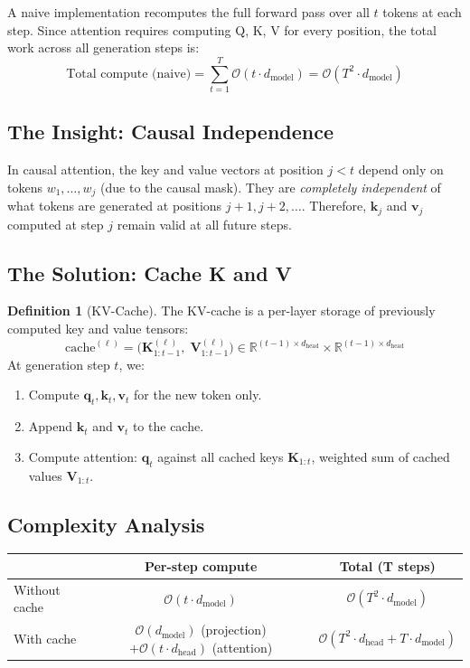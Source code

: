 \documentclass[11pt, a4paper]{article}
\theoremstyle{definition}
\newtheorem{definition}{Definition}[section]
\newcommand{\vq}{\bm{q}}
\newcommand{\vk}{\bm{k}}
\newcommand{\vv}{\bm{v}}
\newcommand{\mK}{\bm{K}}
\newcommand{\mV}{\bm{V}}
\newcommand{\reals}{\mathbb{R}}
\newcommand{\dmodel}{d_{\text{model}}}
\newcommand{\dhead}{d_{\text{head}}}
\begin{document}
A naive implementation recomputes the full forward pass over all $t$ tokens at each step. Since attention requires computing Q, K, V for every position, the total work across all generation steps is:
\begin{equation}
    \text{Total compute (naive)} = \sum_{t=1}^{T} \mathcal{O}(t \cdot \dmodel) = \mathcal{O}(T^2 \cdot \dmodel)
\end{equation}

\subsection{The Insight: Causal Independence}

In causal attention, the key and value vectors at position $j < t$ depend only on tokens $w_1, \ldots, w_j$ (due to the causal mask). They are \emph{completely independent} of what tokens are generated at positions $j+1, j+2, \ldots$. Therefore, $\vk_j$ and $\vv_j$ computed at step $j$ remain valid at all future steps.

\subsection{The Solution: Cache K and V}

\begin{definition}[KV-Cache]
The KV-cache is a per-layer storage of previously computed key and value tensors:
\begin{equation}
    \text{cache}^{(\ell)} = \bigl(\mK^{(\ell)}_{1:t-1}, \; \mV^{(\ell)}_{1:t-1}\bigr) \in \reals^{(t-1) \times \dhead} \times \reals^{(t-1) \times \dhead}
\end{equation}
At generation step $t$, we:
\begin{enumerate}
    \item Compute $\vq_t, \vk_t, \vv_t$ for the new token only.
    \item Append $\vk_t$ and $\vv_t$ to the cache.
    \item Compute attention: $\vq_t$ against all cached keys $\mK_{1:t}$, weighted sum of cached values $\mV_{1:t}$.
\end{enumerate}
\end{definition}

\subsection{Complexity Analysis}

\begin{center}
\begin{tabular}{lcc}
\toprule
& \textbf{Per-step compute} & \textbf{Total (T steps)} \\
\midrule
Without cache & $\mathcal{O}(t \cdot \dmodel)$ & $\mathcal{O}(T^2 \cdot \dmodel)$ \\
With cache    & $\mathcal{O}(\dmodel)$ (projection) $+ \mathcal{O}(t \cdot \dhead)$ (attention) & $\mathcal{O}(T^2 \cdot \dhead + T \cdot \dmodel)$ \\
\bottomrule
\end{tabular}
\end{center}
\end{document}
